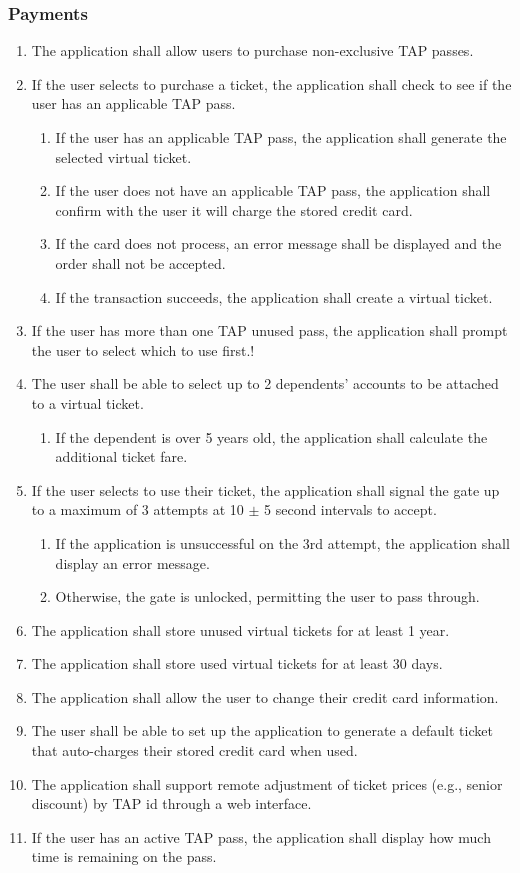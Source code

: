 	\subsubsection{Payments}\begin{enumerate}
		\item The application shall allow users to purchase non-exclusive TAP passes.
		\item If the user selects to purchase a ticket, the application shall check to see if the user has an applicable TAP pass.
			\begin{enumerate}
				\item If the user has an applicable TAP pass, the application shall generate the selected virtual ticket.
				\item If the user does not have an applicable TAP pass, the application shall confirm with the user it will charge the stored credit card.
				\item If the card does not process, an error message shall be displayed and the order shall not be accepted. 
				\item If the transaction succeeds, the application shall create a virtual ticket. 
			\end{enumerate}
		\item If the user has more than one TAP unused pass, the application shall prompt the user to select which to use first.!
		\item The user shall be able to select up to 2 dependents’ accounts to be attached to a virtual ticket.
			\begin{enumerate}
				\item If the dependent is over 5 years old, the application shall calculate the additional ticket fare.
			\end{enumerate}
		\item If the user selects to use their ticket, the application shall signal the gate up to a maximum of 3 attempts at 10 $\pm$ 5 second intervals to accept.
			\begin{enumerate}
				\item If the application is unsuccessful on the 3rd attempt, the application shall display an error message.
				\item Otherwise, the gate is unlocked, permitting the user to pass through.
			\end{enumerate}
		\item The application shall store unused virtual tickets for at least 1 year. 
		\item The application shall store used virtual tickets for at least 30 days.
		\item The application shall allow the user to change their credit card information.
		\item The user shall be able to set up the application to generate a default ticket that auto-charges their stored credit card when used.
		\item The application shall support remote adjustment of ticket prices (e.g., senior discount) by TAP id through a web interface.
		\item If the user has an active TAP pass, the application shall display how much time is remaining on the pass.
	\end{enumerate}		
\newpage	
